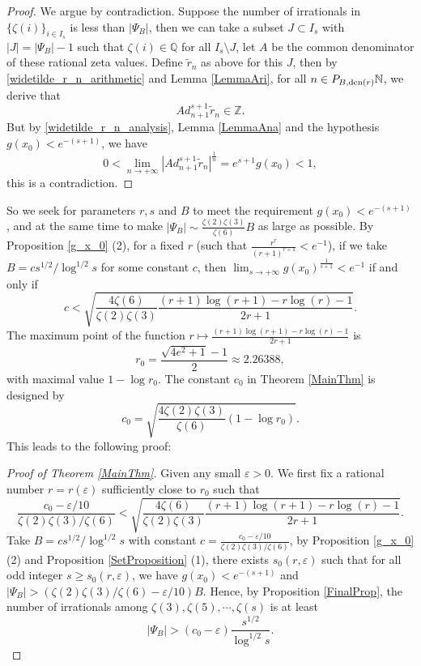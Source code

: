 \documentclass[11pt]{amsart}
\numberwithin{equation}{section}
\begin{document}
\begin{proof}
We argue by contradiction. Suppose the number of irrationals in $\{ \zeta(i) \}_{i \in I_s}$ is less than $|\mathcal{\varPsi}_B|$, then we can take a subset $J \subset I_s$ with $|J| = |\mathcal{\varPsi}_B| -1$ such that $\zeta(i) \in \mathbb{Q}$ for all $I_s \setminus J$, let $A$ be the common denominator of these rational zeta values. Define $\widetilde{r}_{n}$ as above for this $J$, then by \eqref{widetilde_r_n_arithmetic} and Lemma \ref{LemmaAri}, for all $n \in P_{B,{\rm den}(r)}\mathbb{N}$, we derive that
\[Ad_{n+1}^{s+1} \widetilde{r}_{n} \in \mathbb{Z}.\]
But by \eqref{widetilde_r_n_analysis}, Lemma \ref{LemmaAna} and the hypothesis $g(x_0) < e^{-(s+1)}$, we have
\[0 < \lim_{n \rightarrow +\infty} \left| Ad_{n+1}^{s+1}\widetilde{r}_{n} \right|^{\frac{1}{n}} = e^{s+1}g(x_0) < 1, \]
this is a contradiction.
\end{proof}
\smallskip

So we seek for parameters $r,s$ and $B$ to meet the requirement $g(x_0) < e^{-(s+1)}$, and at the same time to make $|\mathcal{\varPsi}_B| \sim \frac{\zeta(2)\zeta(3)}{\zeta(6)} B$ as large as possible. By Proposition \ref{g_x_0} (2), for a fixed $r$ (such that $\frac{r^r}{(r+1)^{r+1}} < e^{-1}$), if we take $B = cs^{1/2} / \log^{1/2} s$ for some constant $c$, then $\lim_{s \rightarrow +\infty} g(x_0)^{\frac{1}{s+1}} < e^{-1}$ if and only if
\[ c < \sqrt{ \frac{4\zeta(6)}{\zeta(2)\zeta(3)} \frac{(r+1)\log(r+1)-r\log(r)-1}{2r+1}}. \]
The maximum point of the function $r \mapsto \frac{(r+1)\log(r+1)-r\log(r)-1}{2r+1}$ is
\[ r_0 = \frac{\sqrt{4e^2+1}-1}{2} \approx 2.26388, \]
with maximal value $1 - \log r_0$. The constant $c_0$ in Theorem \ref{MainThm} is designed by
\[ c_0 = \sqrt{\frac{4\zeta(2)\zeta(3)}{\zeta(6)}\left( 1 -\log r_0  \right)} . \]
This leads to the following proof:

\smallskip
\begin{proof}[Proof of Theorem \ref{MainThm}]
Given any small $\varepsilon > 0$. We first fix a rational number $r = r(\varepsilon)$ sufficiently close to $r_0$ such that
\[ \frac{c_0 - \varepsilon/10}{\zeta(2)\zeta(3)/\zeta(6)} < \sqrt{ \frac{4\zeta(6)}{\zeta(2)\zeta(3)} \frac{(r+1)\log(r+1)-r\log(r)-1}{2r+1}}. \]
Take $B = cs^{1/2}/\log^{1/2} s$ with constant $c = \frac{c_0 - \varepsilon/10}{\zeta(2)\zeta(3)/\zeta(6)}$, by Proposition \ref{g_x_0} (2) and Proposition \ref{SetProposition} (1), there exists $s_0(r,\varepsilon)$ such that for all odd integer $s \geqslant s_0(r,\varepsilon)$, we have $g(x_0) < e^{-(s+1)}$ and $|\mathcal{\varPsi}_B| > (\zeta(2)\zeta(3)/\zeta(6) - \varepsilon/10)B$. Hence, by Proposition \ref{FinalProp}, the number of irrationals among $\zeta(3),\zeta(5),\cdots, \zeta(s)$ is at least
\[ |\mathcal{\varPsi}_B| > (c_0 - \varepsilon) \frac{s^{1/2}}{\log^{1/2} s} .\]
\end{proof}
\bigskip
\end{document}

